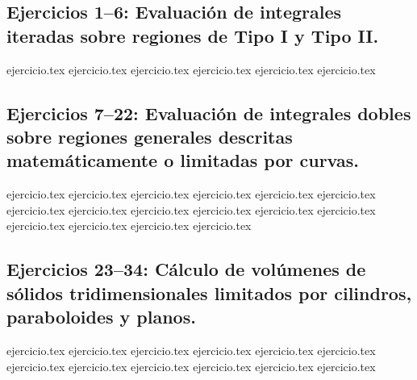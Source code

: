 
\subsection*{Ejercicios 1--6: Evaluación de integrales iteradas sobre regiones de Tipo I y Tipo II.}
\begin{enumerate}
    {ejercicio.tex}
    {ejercicio.tex}
    {ejercicio.tex}
    {ejercicio.tex}
    {ejercicio.tex}
    {ejercicio.tex}
\end{enumerate}

\subsection*{Ejercicios 7--22: Evaluación de integrales dobles sobre regiones generales descritas matemáticamente o limitadas por curvas.}
\begin{enumerate}
    \setcounter{enumi}{6}
    {ejercicio.tex}
    {ejercicio.tex}
    {ejercicio.tex}
    {ejercicio.tex}
    {ejercicio.tex}
    {ejercicio.tex}
    {ejercicio.tex}
    {ejercicio.tex}
    {ejercicio.tex}
    {ejercicio.tex}
    {ejercicio.tex}
    {ejercicio.tex}
    {ejercicio.tex}
    {ejercicio.tex}
    {ejercicio.tex}
    {ejercicio.tex}
\end{enumerate}

\subsection*{Ejercicios 23--34: Cálculo de volúmenes de sólidos tridimensionales limitados por cilindros, paraboloides y planos.}
\begin{enumerate}
    \setcounter{enumi}{22}
    {ejercicio.tex}
    {ejercicio.tex}
    {ejercicio.tex}
    {ejercicio.tex}
    {ejercicio.tex}
    {ejercicio.tex}
    {ejercicio.tex}
    {ejercicio.tex}
    {ejercicio.tex}
    {ejercicio.tex}
    {ejercicio.tex}
    {ejercicio.tex}
\end{enumerate}

